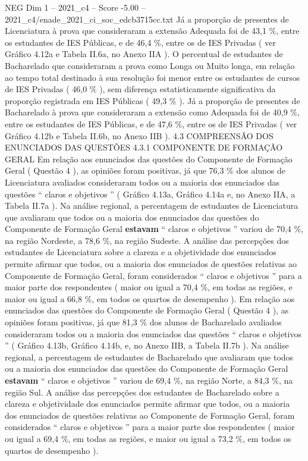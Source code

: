 \begin{textsample}{NEG Dim 1 – 2021\_c4 – Score -5.00 – 2021\_c4/enade\_2021\_ci\_soc\_edcb3715cc.txt}
Já a proporção de presentes de Licenciatura à prova que consideraram a extensão Adequada foi de 43,1 \%, entre os estudantes de IES Públicas, e de 46,4 \%, entre os de IES Privadas ( ver Gráfico 4.12a e Tabela II.6a, no Anexo IIA ).
O percentual de estudantes de Bacharelado que consideraram a prova como Longa ou Muito longa, em relação ao tempo total destinado à sua resolução foi menor entre os estudantes de cursos de IES Privadas ( 46,0 \% ), sem diferença estatisticamente significativa da proporção registrada em IES Públicas ( 49,3 \% ).
Já a proporção de presentes de Bacharelado à prova que consideraram a extensão como Adequada foi de 40,9 \%, entre os estudantes de IES Públicas, e de 47,6 \%, entre os de IES Privadas ( ver Gráfico 4.12b e Tabela II.6b, no Anexo IIB ). 4.3 COMPREENSÃO DOS ENUNCIADOS DAS QUESTÕES 4.3.1 COMPONENTE DE FORMAÇÃO GERAL Em relação aos enunciados das questões do Componente de Formação Geral ( Questão 4 ), as opiniões foram positivas, já que 76,3 \% dos alunos de Licenciatura avaliados consideraram todos ou a maioria dos enunciados das questões “ claros e objetivos ” ( Gráfico 4.13a, Gráfico 4.14a e, no Anexo IIA, a Tabela II.7a ).
Na análise regional, a percentagem de estudantes de Licenciatura que avaliaram que todos ou a maioria dos enunciados das questões do Componente de Formação Geral \textbf{estavam} “ claros e objetivos ” variou de 70,4 \%, na região Nordeste, a 78,6 \%, na região Sudeste.
A análise das percepções dos estudantes de Licenciatura sobre a clareza e a objetividade dos enunciados permite afirmar que todos, ou a maioria dos enunciados de questões relativas ao Componente de Formação Geral, foram considerados “ claros e objetivos ” para a maior parte dos respondentes ( maior ou igual a 70,4 \%, em todas as regiões, e maior ou igual a 66,8 \%, em todos os quartos de desempenho ).
Em relação aos enunciados das questões do Componente de Formação Geral ( Questão 4 ), as opiniões foram positivas, já que 81,3 \% dos alunos de Bacharelado avaliados consideraram todos ou a maioria dos enunciados das questões “ claros e objetivos ” ( Gráfico 4.13b, Gráfico 4.14b, e, no Anexo IIB, a Tabela II.7b ).
Na análise regional, a percentagem de estudantes de Bacharelado que avaliaram que todos ou a maioria dos enunciados das questões do Componente de Formação Geral \textbf{estavam} “ claros e objetivos ” variou de 69,4 \%, na região Norte, a 84,3 \%, na região Sul.
A análise das percepções dos estudantes de Bacharelado sobre a clareza e objetividade dos enunciados permite afirmar que todos, ou a maioria dos enunciados de questões relativas ao Componente de Formação Geral, foram considerados “ claros e objetivos ” para a maior parte dos respondentes ( maior ou igual a 69,4 \%, em todas as regiões, e maior ou igual a 73,2 \%, em todos os quartos de desempenho ).

\end{textsample}
